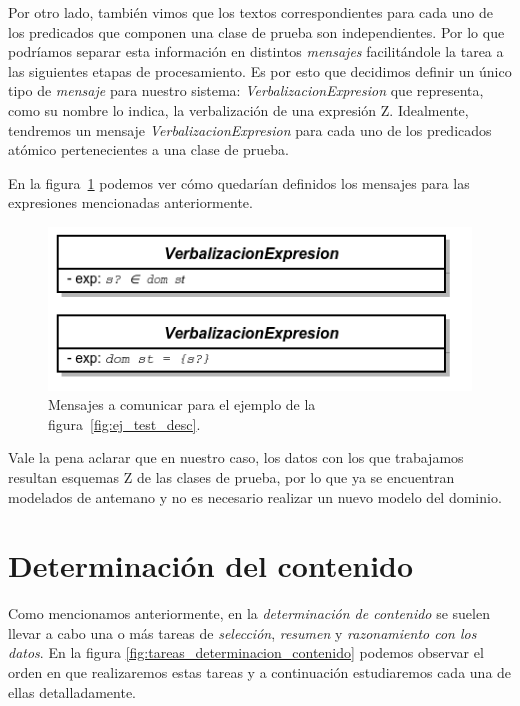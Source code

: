 \bigskip
Por otro lado, también vimos que los textos correspondientes para cada uno de los predicados que componen una clase de prueba son independientes. Por lo que podríamos separar esta información en distintos \emph{mensajes} facilitándole la tarea a las siguientes etapas de procesamiento. Es por esto que decidimos definir un único tipo de \emph{mensaje} para nuestro sistema: \emph{VerbalizacionExpresion} que representa, como su nombre lo indica, la verbalización de una expresión Z. Idealmente, tendremos un mensaje \emph{VerbalizacionExpresion} para cada uno de los predicados atómico pertenecientes a una clase de prueba.

En la figura~\ref{fig:ej_mensajes} podemos ver cómo quedarían definidos los mensajes para las expresiones mencionadas anteriormente.

\begin{figure}[H]
  	\centering
	\includegraphics[scale=0.4]{img/mensajes.png}
	\caption{Mensajes a comunicar para el ejemplo de la figura~\ref{fig:ej_test_desc}.}
  	\label{fig:ej_mensajes}
\end{figure}

Vale la pena aclarar que en nuestro caso, los datos con los que trabajamos resultan esquemas Z de las clases de prueba, por lo que ya se encuentran modelados de antemano y no es necesario realizar un nuevo modelo del dominio.
 

\section{Determinación del contenido}
\label{cap:determinacion_contenido}

Como mencionamos anteriormente, en la \emph{determinación de contenido} se suelen llevar a cabo una o más tareas de \emph{selección}, \emph{resumen} y \emph{razonamiento con los datos}. En la figura \ref{fig:tareas_determinacion_contenido} podemos observar el orden en que realizaremos estas tareas y a continuación estudiaremos cada una de ellas detalladamente.

